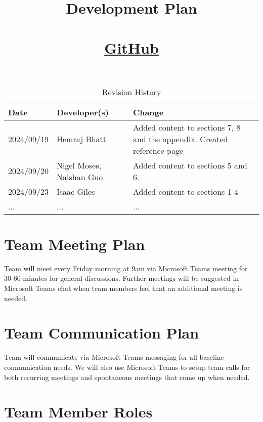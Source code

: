 \documentclass{article}
\title{Development Plan\\\progname\\\href{https://github.com/John-Popovici/duel-of-the-eights.git}{GitHub}}
\author{\authname}
\date{}
\begin{document}
\maketitle

\begin{table}[hp]
\caption{Revision History} \label{TblRevisionHistory}
\begin{tabularx}{\textwidth}{llX}
\toprule
\textbf{Date} & \textbf{Developer(s)} & \textbf{Change}\\
\midrule
2024/09/19 & Hemraj Bhatt & Added content to sections 7, 8 and the appendix. Created reference page\\
2024/09/20 & Nigel Moses, Naishan Guo & Added content to sections 5 and 6.\\
2024/09/23 & Isaac Giles & Added content to sections 1-4\\
... & ... & ...\\
\bottomrule
\end{tabularx}
\end{table}

\section{Team Meeting Plan}

Team will meet every Friday morning at 9am via Microsoft Teams meeting for 30-60 minutes for general discussions. Further meetings will be suggested in Microsoft Teams chat when team members feel that an additional meeting is needed.

\section{Team Communication Plan}

Team will communicate via Microsoft Teams messaging for all baseline communication needs. We will also use Microsoft Teams to setup team calls for both recurring meetings and spontaneous meetings that come up when needed.

\section{Team Member Roles}
\end{document}
